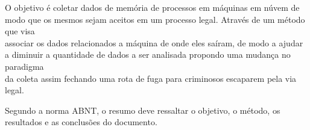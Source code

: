 \documentclass[12pt,				%
	openright,			%
	oneside,			%
	a4paper,			%
	english,			%
	brazil				%
	]{abntex2}
\begin{document}
\pagebreak

%
%

%


\setlength{\absparsep}{18pt} %
\begin{resumo}
O objetivo é coletar dados de memória de processos em máquinas em núvem de modo que os mesmos sejam aceitos em um processo legal. Através de um método que visa \\
associar os dados relacionados a máquina de onde eles saíram, de modo a ajudar a diminuir a quantidade de dados a ser analisada propondo uma mudança no paradigma \\
da coleta assim fechando uma rota de fuga para criminosos escaparem pela via legal.

Segundo a norma ABNT, o resumo deve ressaltar o  objetivo, o método, os resultados e as conclusões do documento.

 

\end{resumo}

%
%  


\end{document}
